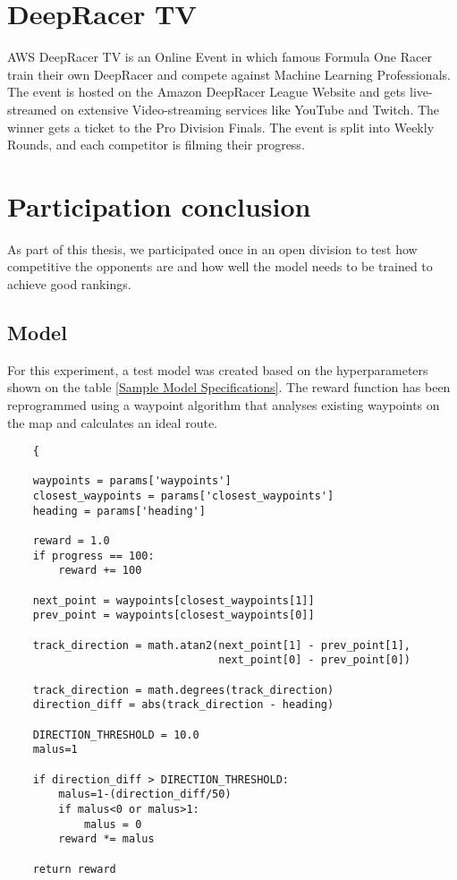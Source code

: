 \section{DeepRacer TV}
AWS DeepRacer TV is an Online Event in which famous Formula One Racer train their own DeepRacer and compete against Machine Learning Professionals. The event is hosted on the Amazon DeepRacer League Website and gets live-streamed on extensive Video-streaming services like YouTube and Twitch. The winner gets a ticket to the Pro Division Finals. The event is split into Weekly Rounds, and each competitor is filming their progress. 

\section{Participation conclusion}
As part of this thesis, we participated once in an open division to test how competitive the opponents are and how well the model needs to be trained to achieve good rankings.  

\subsection{Model}
For this experiment, a test model was created based on the hyperparameters shown on the table \ref{Sample Model Specifications}. The reward function has been reprogrammed using a waypoint algorithm that analyses existing waypoints on the map and calculates an ideal route.

\begin{listing}[H]
    \begin{verbatim}
    {
     
    waypoints = params['waypoints']
    closest_waypoints = params['closest_waypoints']
    heading = params['heading']

    reward = 1.0
    if progress == 100:
        reward += 100

    next_point = waypoints[closest_waypoints[1]]
    prev_point = waypoints[closest_waypoints[0]]
    
    track_direction = math.atan2(next_point[1] - prev_point[1], 
                                 next_point[0] - prev_point[0]) 
   
    track_direction = math.degrees(track_direction)
    direction_diff = abs(track_direction - heading)
    
    DIRECTION_THRESHOLD = 10.0
    malus=1

    if direction_diff > DIRECTION_THRESHOLD:
        malus=1-(direction_diff/50)
        if malus<0 or malus>1:
            malus = 0
        reward *= malus

    return reward
    \end{verbatim}
\end{listing}

